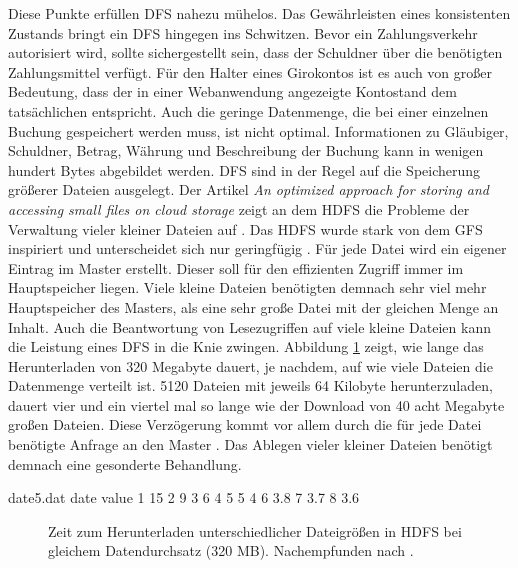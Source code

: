 \documentclass[12pt,oneside,a4paper,parskip]{scrbook}
\begin{document}
Diese Punkte erfüllen DFS nahezu mühelos. Das Gewährleisten eines konsistenten Zustands bringt ein DFS hingegen ins Schwitzen. Bevor ein Zahlungsverkehr autorisiert wird, sollte sichergestellt sein, dass der Schuldner über die benötigten Zahlungsmittel verfügt. Für den Halter eines Girokontos ist es auch von großer Bedeutung, dass der in einer Webanwendung angezeigte Kontostand dem tatsächlichen entspricht. Auch die geringe Datenmenge, die bei einer einzelnen Buchung gespeichert werden muss, ist nicht optimal. Informationen zu Gläubiger, Schuldner, Betrag, Währung und Beschreibung der Buchung kann in wenigen hundert Bytes abgebildet werden. DFS sind in der Regel auf die Speicherung größerer Dateien ausgelegt. Der Artikel \textit{An optimized approach for storing and accessing small files on cloud storage} zeigt an dem HDFS die Probleme der Verwaltung vieler kleiner Dateien auf \cite{hdfsSmallFiles}. Das HDFS wurde stark von dem GFS inspiriert und unterscheidet sich nur geringfügig \cite{hdfsGfs}. Für jede Datei wird ein eigener Eintrag im Master erstellt. Dieser soll für den effizienten Zugriff immer im Hauptspeicher liegen. Viele kleine Dateien benötigten demnach sehr viel mehr Hauptspeicher des Masters, als eine sehr große Datei mit der gleichen Menge an Inhalt. Auch die Beantwortung von Lesezugriffen auf viele kleine Dateien kann die Leistung eines DFS in die Knie zwingen. Abbildung \ref{hdfsSmallFiles} zeigt, wie lange das Herunterladen von 320 Megabyte dauert, je nachdem, auf wie viele Dateien die Datenmenge verteilt ist. 5120 Dateien mit jeweils 64 Kilobyte herunterzuladen, dauert vier und ein viertel mal so lange wie der Download von 40 acht Megabyte großen Dateien. Diese Verzögerung kommt vor allem durch die für jede Datei benötigte Anfrage an den Master \cite{hdfsSmallFiles}. Das Ablegen vieler kleiner Dateien benötigt demnach eine gesonderte Behandlung.



\begin{filecontents}{date5.dat}
date  value
1   15
2   9
3   6
4   5
5   4
6   3.8
7   3.7
8   3.6
\end{filecontents}


\begin{figure}
\begin{center}
\caption[Zeit zum Herunterladen unterschiedlicher Dateigrößen in HDFS]{Zeit zum Herunterladen unterschiedlicher Dateigrößen in HDFS bei gleichem Datendurchsatz (320 MB). Nachempfunden nach \cite{hdfsSmallFiles}.}
\label{hdfsSmallFiles}
\end{center}
\end{figure}
\end{document}
